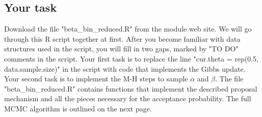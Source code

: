\documentclass[11pt]{article}
\theoremstyle{remark}
\theoremstyle{definition}
\numberwithin{equation}{section}
\numberwithin{figure}{section}
\begin{document}
\subsection*{Your task}
Download the file "beta\_bin\_reduced.R" from the module web site. We will go through this R script together at first. After you become familiar
with data structures used in the script, you will fill in two gaps, marked by "TO DO" comments in the script. Your first task is to replace the 
line "cur.theta = rep(0.5, data.sample.size)" in the script with code that implements the Gibbs update. Your second task is to implement the M-H steps to sample $\alpha$ and $\beta$. The file "beta\_bin\_reduced.R"  contains functions that implement the described proposal mechanism and all the pieces necessary for the acceptance probability. The full MCMC algorithm is outlined on the next page.
\end{document}
